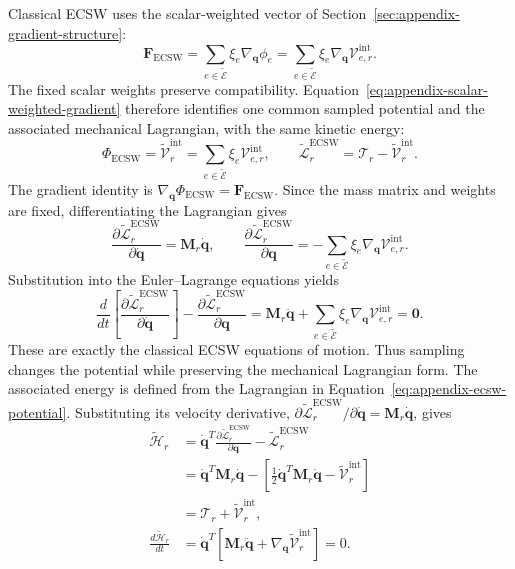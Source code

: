 \documentclass[a4paper,12pt]{article}
\newcommand{\vect}[1]{\boldsymbol{#1}}
\newcommand{\matr}[1]{\boldsymbol{#1}}
\begin{document}
Classical ECSW uses the scalar-weighted vector of Section~\ref{sec:appendix-gradient-structure}:
\[
 \vect{F}_{\mathrm{ECSW}}
 =\sum_{e\in\widetilde{\mathcal E}}\xi_e\nabla_{\vect{q}}\phi_e
 =\sum_{e\in\widetilde{\mathcal E}}\xi_e\nabla_{\vect{q}}\mathcal V_{e,r}^{\mathrm{int}}.
\]
The fixed scalar weights preserve compatibility. Equation~\eqref{eq:appendix-scalar-weighted-gradient} therefore identifies one common sampled potential and the associated mechanical Lagrangian, with the same kinetic energy:
\begin{equation}
 \Phi_{\mathrm{ECSW}}
 =\widetilde{\mathcal V}_r^{\mathrm{int}}
 =\sum_{e\in\widetilde{\mathcal E}}\xi_e\mathcal V_{e,r}^{\mathrm{int}},
 \qquad
 \widetilde{\mathcal L}_r^{\mathrm{ECSW}}
 =\mathcal T_r-\widetilde{\mathcal V}_r^{\mathrm{int}}.
 \label{eq:appendix-ecsw-potential}
\end{equation}
The gradient identity is $\nabla_{\vect{q}}\Phi_{\mathrm{ECSW}}=\vect{F}_{\mathrm{ECSW}}$. Since the mass matrix and weights are fixed, differentiating the Lagrangian gives
\[
 \frac{\partial\widetilde{\mathcal L}_r^{\mathrm{ECSW}}}
      {\partial\dot{\vect{q}}}=\matr{M}_r\dot{\vect{q}},
 \qquad
 \frac{\partial\widetilde{\mathcal L}_r^{\mathrm{ECSW}}}
      {\partial\vect{q}}
 =-\sum_{e\in\widetilde{\mathcal E}}\xi_e
      \nabla_{\vect{q}}\mathcal V_{e,r}^{\mathrm{int}}.
\]
Substitution into the Euler--Lagrange equations yields
\begin{equation}
 \frac{d}{dt}\left[
    \frac{\partial\widetilde{\mathcal L}_r^{\mathrm{ECSW}}}
         {\partial\dot{\vect{q}}}\right]
 -\frac{\partial\widetilde{\mathcal L}_r^{\mathrm{ECSW}}}{\partial\vect{q}}
 =\matr{M}_r\ddot{\vect{q}}
  +\sum_{e\in\widetilde{\mathcal E}}\xi_e
      \nabla_{\vect{q}}\mathcal V_{e,r}^{\mathrm{int}}
 =\vect{0}.
 \label{eq:appendix-ecsw-euler-lagrange}
\end{equation}
These are exactly the classical ECSW equations of motion. Thus sampling changes the potential while preserving the mechanical Lagrangian form. The associated energy is defined from the Lagrangian in Equation~\eqref{eq:appendix-ecsw-potential}. Substituting its velocity derivative, $\partial\widetilde{\mathcal L}_r^{\mathrm{ECSW}}/\partial\dot{\vect{q}}=\matr{M}_r\dot{\vect{q}}$, gives
\begin{equation}
 \begin{aligned}
 \widetilde{\mathcal H}_r
 &=\dot{\vect{q}}^T
    \frac{\partial\widetilde{\mathcal L}_r^{\mathrm{ECSW}}}
         {\partial\dot{\vect{q}}}
   -\widetilde{\mathcal L}_r^{\mathrm{ECSW}}\\
 &=\dot{\vect{q}}^T\matr{M}_r\dot{\vect{q}}
   -\left[\frac12\dot{\vect{q}}^T\matr{M}_r\dot{\vect{q}}
                -\widetilde{\mathcal V}_r^{\mathrm{int}}\right]\\
 &=\mathcal T_r+\widetilde{\mathcal V}_r^{\mathrm{int}},\\
 \frac{d\widetilde{\mathcal H}_r}{dt}
 &=\dot{\vect{q}}^T
      \left[\matr{M}_r\ddot{\vect{q}}
               +\nabla_{\vect{q}}\widetilde{\mathcal V}_r^{\mathrm{int}}\right]
 =0.
 \end{aligned}
 \label{eq:appendix-ecsw-energy-balance}
\end{equation}
\end{document}
